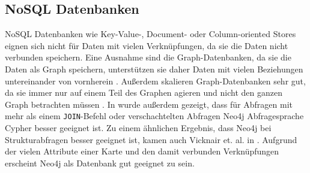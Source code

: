 \subsection{NoSQL Datenbanken}
\ac{NoSQL} Datenbanken wie Key-Value-, Document- oder Column-oriented Stores eignen sich nicht für Daten mit vielen Verknüpfungen, da sie die Daten nicht verbunden speichern. Eine Ausnahme sind die Graph-Datenbanken, da sie die Daten als Graph speichern, unterstützen sie daher Daten mit vielen Beziehungen untereinander von vornherein  \cite{robinsongraph:2015}. Außerdem skalieren Graph-Datenbanken sehr gut, da sie immer nur auf einem Teil des Graphen agieren und nicht den ganzen Graph betrachten müssen \cite{robinsongraph:2015}. In \cite{jaiswal2013comparative} wurde außerdem gezeigt, dass für Abfragen mit mehr als einem \verb|JOIN|-Befehl oder verschachtelten Abfragen Neo4j Abfragesprache Cypher besser geeignet ist. Zu einem ähnlichen Ergebnis, dass Neo4j bei Strukturabfragen besser geeignet ist, kamen auch Vicknair et. al. in \cite{vicknair2010comparison}. Aufgrund der vielen Attribute einer Karte und den damit verbunden Verknüpfungen erscheint Neo4j als Datenbank gut geeignet zu sein.